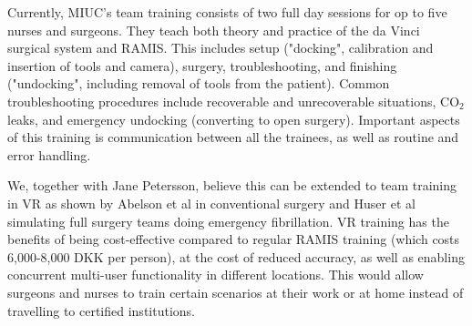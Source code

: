 \documentclass[conference]{IEEEtran}
\begin{document}
Currently, MIUC's team training consists of two full day sessions for op to five nurses and surgeons. They teach both theory and practice of the da Vinci surgical system and RAMIS. This includes setup ("docking", calibration and insertion of tools and camera), surgery, troubleshooting, and finishing ("undocking", including removal of tools from the patient). Common troubleshooting procedures include recoverable and unrecoverable situations, CO$_2$ leaks, and emergency undocking (converting to open surgery). Important aspects of this training is communication between all the trainees, as well as routine and error handling.

We, together with Jane Petersson, believe this can be extended to team training in VR as shown by Abelson et al in conventional surgery and Huser et al simulating full surgery teams doing emergency fibrillation\citep{abelson_virtual_2015,huser_simulated_2014}. VR training has the benefits of being cost-effective compared to regular RAMIS training (which costs 6,000-8,000 DKK per person), at the cost of reduced accuracy, as well as enabling concurrent multi-user functionality in different locations. This would allow surgeons and nurses to train certain scenarios at their work or at home instead of travelling to certified institutions. 
\end{document}
